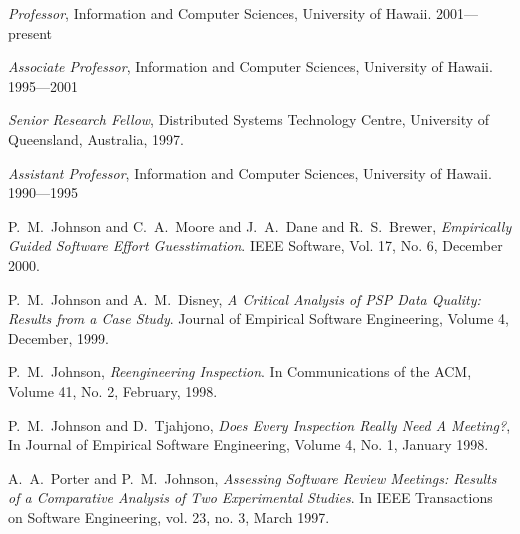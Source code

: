 \begin{Appointments}
\item {\em Professor},  Information and Computer
  Sciences, University of Hawaii.  2001---present

\item {\em Associate Professor},  Information and Computer
  Sciences, University of Hawaii.  1995---2001

\item {\em Senior Research Fellow},  Distributed Systems Technology Centre,
University of Queensland, Australia, 1997.

\item {\em Assistant Professor},   Information and Computer
  Sciences, University of Hawaii.  1990---1995

\end{Appointments}




\begin{Publications: Closely Related}
  
\item P.~M.~Johnson and C.~A.~Moore and J.~A.~Dane and R.~S.~Brewer, {\em
    Empirically Guided Software Effort Guesstimation}.  IEEE Software, Vol.
  17, No. 6, December 2000.
  
\item P.~M.~Johnson and A.~M.~Disney, {\em A Critical Analysis of PSP Data
    Quality: Results from a Case Study}.  Journal of Empirical Software
  Engineering, Volume 4, December, 1999.
  
\item P.~M.~Johnson, {\em Reengineering Inspection}.  In Communications of
  the ACM, Volume 41, No. 2, February, 1998.
  
\item P.~M.~Johnson and D.~Tjahjono, {\em Does Every Inspection Really Need
    A Meeting?}, In Journal of Empirical Software Engineering, Volume 4,
  No. 1, January 1998.
  
\item A.~A.~Porter and P.~M.~Johnson, {\em Assessing Software Review
    Meetings: Results of a Comparative Analysis of Two Experimental
    Studies}.  In IEEE Transactions on Software Engineering, vol. 23, no.
  3, March 1997.

\end{Publications: Closely Related}


